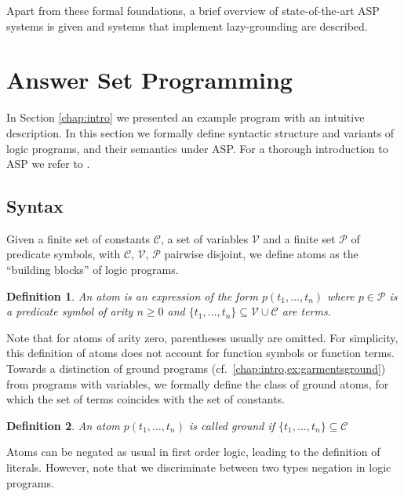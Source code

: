 \documentclass{vutinfth} %
\newtheorem{definition}{Definition}[section]
\begin{document}
Apart from these formal foundations, a brief overview of state-of-the-art ASP systems is given and systems that implement lazy-grounding are described.

\section{Answer Set Programming}

In Section \ref{chap:intro} we presented an example program with an intuitive description. In this section we formally define syntactic structure and variants of logic programs, and their semantics under ASP. For a thorough introduction to ASP we refer to \cite{DBLP:conf/rweb/EiterIK09}.

\subsection{Syntax}


Given a finite set of constants $\mathcal{C}$, a set of variables $\mathcal{V}$ and a finite set $\mathcal{P}$ of predicate symbols, with $\mathcal{C}$, $\mathcal{V}$, $\mathcal{P}$ pairwise disjoint, we define atoms as the \enquote{building blocks} of logic programs.

\begin{definition}
An \emph{atom} is an expression of the form $p(t_1, \ldots , t_n)$ where $p \in \mathcal{P}$ is a predicate symbol of arity $n \geq 0$ and $\{ t_1, \ldots , t_n \} \subseteq \mathcal{V} \cup \mathcal{C}$ are terms.
\end{definition}

Note that for atoms of arity zero, parentheses usually are omitted. For simplicity, this definition of atoms does not account for function symbols or function terms. Towards a distinction of ground programs (cf.~\ref{chap:intro,ex:garmentsground}) from programs with variables, we formally define the class of ground atoms, for which the set of terms coincides with the set of constants.

\begin{definition}
An atom $p(t_1, \ldots , t_n)$ is called \emph{ground} if $\{ t_1, \ldots , t_n \} \subseteq \mathcal{C}$
\end{definition}

Atoms can be negated as usual in first order logic, leading to the definition of literals. However, note that we discriminate between two types negation in logic programs.
\end{document}
